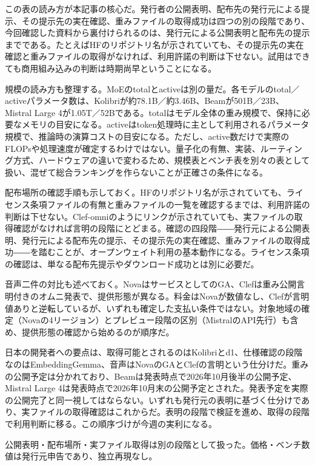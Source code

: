 この表の読み方が本記事の核心だ。発行者の公開表明、配布先の発行元による提示、その提示先の実在確認、重みファイルの取得成功は四つの別の段階であり、今回確認した資料から裏付けられるのは、発行元による公開表明と配布先の提示までである。たとえばHFのリポジトリ名が示されていても、その提示先の実在確認と重みファイルの取得がなければ、利用許諾の判断は下せない。試用はできても商用組み込みの判断は時期尚早ということになる。\cite{kolibri}\cite{beam}\cite{mistral4}\cite{clefomni}

規模の読み方も整理する。MoEのtotalとactiveは別の量だ。各モデルのtotal／activeパラメータ数は、Kolibriが約78.1B／約3.46B、Beamが501B／23B、Mistral Large 4が1.05T／52Bである。totalはモデル全体の重み規模で、保持に必要なメモリの目安になる。activeはtoken処理時に主として利用されるパラメータ規模で、推論時の演算コストの目安になる。ただし、active数だけで実際のFLOPsや処理速度が確定するわけではない。量子化の有無、実装、ルーティング方式、ハードウェアの違いで変わるため、規模表とベンチ表を別々の表として扱い、混ぜて総合ランキングを作らないことが正確さの条件になる。\cite{kolibri}\cite{beam}\cite{mistral4}

配布場所の確認手順も示しておく。HFのリポジトリ名が示されていても、ライセンス条項ファイルの有無と重みファイルの一覧を確認するまでは、利用許諾の判断は下せない。Clef-omniのようにリンクが示されていても、実ファイルの取得確認がなければ言明の段階にとどまる。確認の四段階――発行元による公開表明、発行元による配布先の提示、その提示先の実在確認、重みファイルの取得成功――を踏むことが、オープンウェイト利用の基本動作になる。ライセンス条項の確認は、単なる配布先提示やダウンロード成功とは別に必要だ。\cite{kolibri}\cite{clefomni}

音声二件の対比も述べておく。NovaはサービスとしてのGA、Clefは重み公開言明付きのオムニ発表で、提供形態が異なる。料金はNovaが数値なし、Clefが言明値ありと逆転しているが、いずれも確定した支払い条件ではない。対象地域の確定（Novaの4リージョン）とプレビュー段階の区別（MistralのAPI先行）も含め、提供形態の確認から始めるのが順序だ。\cite{novasonic}\cite{clefomni}\cite{mistral4}\cite{beam}

日本の開発者への要点は、取得可能とされるのはKolibriとd1、仕様確認の段階なのはEmbeddingGemma、音声はNovaのGAとClefの言明という仕分けだ。重みの公開予定は分かれており、Beamは発表時点で2026年10月後半の公開予定、Mistral Large 4は発表時点で2026年10月末の公開予定とされた。発表予定を実際の公開完了と同一視してはならない。いずれも発行元の表明に基づく仕分けであり、実ファイルの取得確認はこれからだ。表明の段階で検証を進め、取得の段階で利用判断に移る。この順序づけが今週の実利になる。\cite{kolibri}\cite{liquidd1}\cite{embedgemma2}\cite{novasonic}\cite{clefomni}\cite{beam}\cite{mistral4}

\begin{technicalnote}[Note]
公開表明・配布場所・実ファイル取得は別の段階として扱った。価格・ベンチ数値は発行元申告であり、独立再現なし。
\end{technicalnote}
